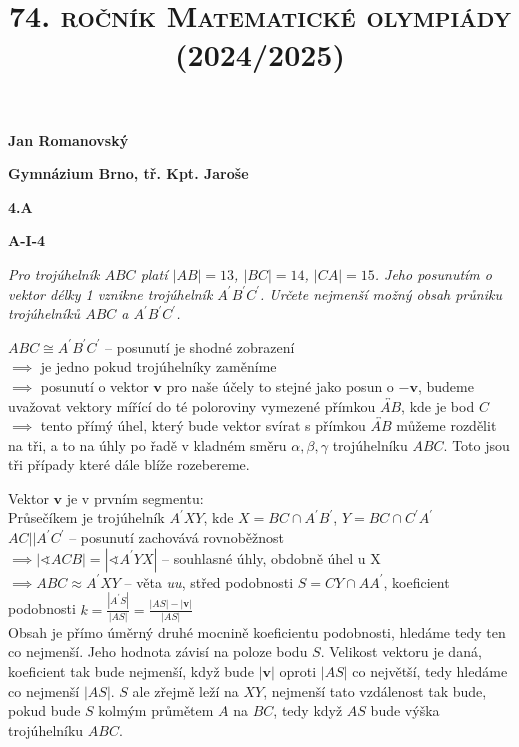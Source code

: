 \documentclass{article}
\title{\normalsize{\vspace{-2cm}\textsc{74. ročník Matematické olympiády (2024/2025)}\vspace{-1.7cm}}}
\date{}
\author{}
\begin{document}
\maketitle

\textbf{ }

\noindent \textbf{Jan Romanovský}

\noindent \textbf{Gymnázium Brno, tř. Kpt. Jaroše}

\noindent \textbf{4.A}

\noindent \textbf{A-\textrm{I}-4}

\textbf{ }

\textit{Pro trojúhelník $ABC$ platí $|AB| = 13$, $|BC| = 14$, $|CA| = 15$. Jeho posunutím o vektor délky 1 vznikne trojúhelník $A^\prime B^\prime C^\prime$. Určete nejmenší možný obsah průniku trojúhelníků $ABC$ a $A^\prime B^\prime C^\prime$.}

\textbf{ }

$ABC \cong A^\prime B^\prime C^\prime$ -- posunutí je shodné zobrazení\\
$\implies$ je jedno pokud trojúhelníky zaměníme\\
$\implies$ posunutí o vektor $\mathbf{v}$ pro naše účely to stejné jako posun o $\mathbf{-v}$, budeme uvažovat vektory mířící do té poloroviny vymezené přímkou $\overleftrightarrow{AB}$, kde je bod $C$\\
$\implies$ tento přímý úhel, který bude vektor svírat s přímkou $\overleftrightarrow{AB}$ můžeme rozdělit na tři, a to na úhly po řadě v kladném směru $\alpha, \beta, \gamma$ trojúhelníku $ABC$. Toto jsou tři případy které dále blíže rozebereme.

\textbf{ }

Vektor $\mathbf{v}$ je v prvním segmentu:\\
Průsečíkem je trojúhelník $A^\prime XY$, kde $X = BC \cap A^\prime B^\prime$, $Y = BC \cap C^\prime A^\prime$\\
$AC || A^\prime C^\prime$ -- posunutí zachovává rovnoběžnost\\
$\implies | \sphericalangle ACB| = | \sphericalangle A^\prime YX|$ -- souhlasné úhly, obdobně úhel u X\\
$\implies ABC \approx A^\prime XY$ -- věta \textit{uu}, střed podobnosti $S = CY \cap AA^\prime$, koeficient podobnosti $k = \frac{|A^\prime S|}{|AS|} = \frac{|AS|-|\textbf{v}|}{|AS|}$\\
Obsah je přímo úměrný druhé mocnině koeficientu podobnosti, hledáme tedy ten co nejmenší. Jeho hodnota závisí na poloze bodu $S$. Velikost vektoru je daná, koeficient tak bude nejmenší, když bude $|\textbf{v}|$ oproti $|AS|$ co největší, tedy hledáme co nejmenší $|AS|$. $S$ ale zřejmě leží na $XY$, nejmenší tato vzdálenost tak bude, pokud bude $S$ kolmým průmětem $A$ na $BC$, tedy když $AS$ bude výška trojúhelníku $ABC$.\\
\end{document}
